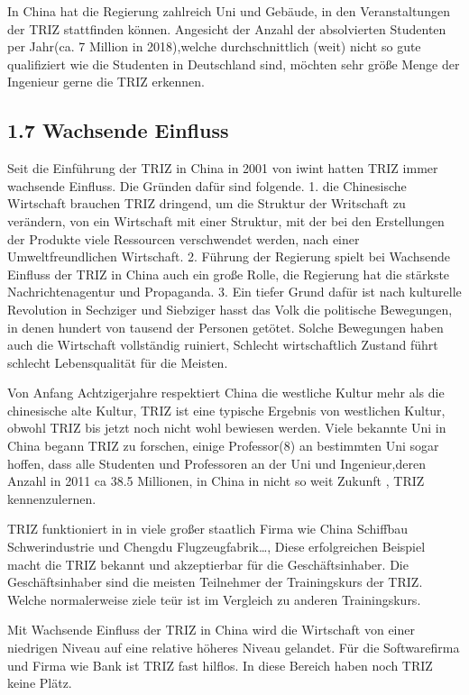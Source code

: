 \documentclass[11pt,a4paper]{article}
\begin{document}
In China hat die Regierung zahlreich Uni und Gebäude, in den Veranstaltungen
der TRIZ stattfinden können. Angesicht der Anzahl der absolvierten Studenten
per Jahr(ca. 7 Million in 2018),welche durchschnittlich (weit) nicht so gute
qualifiziert wie die Studenten in Deutschland sind, möchten  sehr größe Menge
der Ingenieur  gerne die TRIZ erkennen.  
  
\subsection{1.7 Wachsende Einfluss}

Seit die Einführung der TRIZ in China in 2001 von iwint hatten TRIZ immer
wachsende Einfluss. Die Gründen dafür sind folgende. 1. die Chinesische
Wirtschaft brauchen TRIZ dringend, um die Struktur der Writschaft zu
verändern,  von ein Wirtschaft mit einer Struktur, mit der bei den
Erstellungen der Produkte viele Ressourcen verschwendet werden,  nach einer
Umweltfreundlichen Wirtschaft. 2. Führung der Regierung spielt bei Wachsende
Einfluss der TRIZ in China auch ein große Rolle, die Regierung hat die
stärkste Nachrichtenagentur und Propaganda. 3. Ein tiefer Grund dafür ist nach
kulturelle Revolution in Sechziger und Siebziger hasst das Volk die politische
Bewegungen, in denen hundert von tausend der Personen getötet. Solche
Bewegungen haben auch die Wirtschaft vollständig ruiniert, Schlecht
wirtschaftlich Zustand führt schlecht Lebensqualität für die Meisten. 

Von Anfang Achtzigerjahre respektiert China die westliche Kultur mehr als die
chinesische alte Kultur, TRIZ ist eine typische Ergebnis von westlichen
Kultur, obwohl TRIZ bis jetzt noch nicht wohl bewiesen werden. Viele bekannte
Uni in China begann TRIZ zu forschen, einige Professor(8) an bestimmten Uni
sogar hoffen, dass alle Studenten und Professoren an der Uni und
Ingenieur,deren Anzahl in 2011 ca 38.5 Millionen, in China in nicht so weit
Zukunft , TRIZ kennenzulernen.  

TRIZ funktioniert in in viele großer staatlich Firma wie China Schiffbau
Schwerindustrie und Chengdu Flugzeugfabrik…, Diese erfolgreichen Beispiel
macht die TRIZ bekannt  und akzeptierbar  für die  Geschäftsinhaber.  Die
Geschäftsinhaber sind die meisten Teilnehmer der Trainingskurs der
TRIZ. Welche normalerweise ziele teür ist im Vergleich zu anderen
Trainingskurs. 

Mit Wachsende Einfluss der TRIZ in China wird die Wirtschaft von einer
niedrigen Niveau auf eine relative höheres Niveau gelandet. Für die
Softwarefirma und Firma wie Bank ist TRIZ fast hilflos. In diese Bereich haben
noch TRIZ keine Plätz. 
\end{document}
